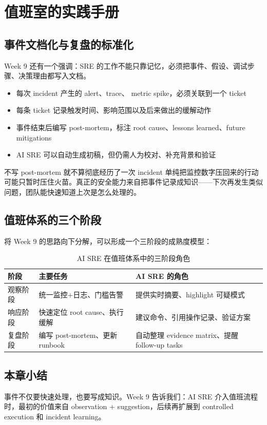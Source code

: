 \section{值班室的实践手册}

\subsection{事件文档化与复盘的标准化}

Week 9 还有一个强调：SRE 的工作不能只靠记忆，必须把事件、假设、调试步骤、决策理由都写入文档。

\begin{itemize}
    \item 每次 incident 产生的 alert、trace、 metric spike，必须关联到一个 ticket
    \item 每条 ticket 记录触发时间、影响范围以及后来做出的缓解动作
    \item 事件结束后编写 post-mortem，标注 root cause、lessons learned、future mitigations
    \item AI SRE 可以自动生成初稿，但仍需人为校对、补充背景和验证
\end{itemize}

\begin{warningbox}{不写 post-mortem 就不算彻底经历了一次 incident}
单纯把监控数字压回来的行动可能只暂时压住火苗。真正的安全能力来自把事件记录成知识——下次再发生类似问题，团队能快速知道上次是怎么处理的。
\end{warningbox}

\subsection{值班体系的三个阶段}

将 Week 9 的思路向下分解，可以形成一个三阶段的成熟度模型：

\begin{table}[H]
\centering
\begin{tabular}{p{} p{} p{}}
\toprule
阶段 & 主要任务 & AI SRE 的角色 \\
\midrule
观察阶段 & 统一监控+日志、门槛告警 & 提供实时摘要、highlight 可疑模式 \\
响应阶段 & 快速定位 root cause、执行缓解 & 建议命令、引用操作记录、验证方案 \\
复盘阶段 & 编写 post-mortem、更新 runbook & 自动整理 evidence matrix、提醒 follow-up tasks \\
\bottomrule
\end{tabular}
\caption{AI SRE 在值班体系中的三阶段角色}
\end{table}

\subsection{本章小结}

事件不仅要快速处理，也要写成知识。Week 9 告诉我们：AI SRE 介入值班流程时，最初的价值来自 observation + suggestion，后续再扩展到 controlled execution 和 incident learning。

